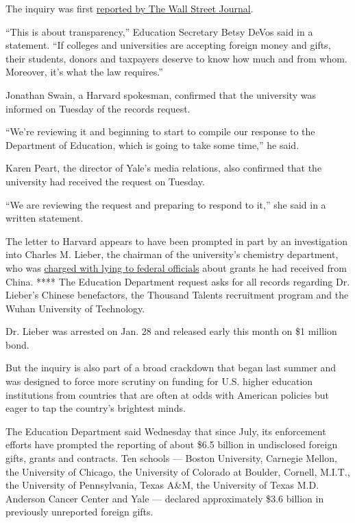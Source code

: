 The inquiry was first
\href{https://www.wsj.com/articles/education-department-investigating-harvard-yale-over-foreign-funding-11581539042}{reported
by The Wall Street Journal}.

``This is about transparency,'' Education Secretary Betsy DeVos said in
a statement. ``If colleges and universities are accepting foreign money
and gifts, their students, donors and taxpayers deserve to know how much
and from whom. Moreover, it's what the law requires.''

Jonathan Swain, a Harvard spokesman, confirmed that the university was
informed on Tuesday of the records request.

``We're reviewing it and beginning to start to compile our response to
the Department of Education, which is going to take some time,'' he
said.

Karen Peart, the director of Yale's media relations, also confirmed that
the university had received the request on Tuesday.

``We are reviewing the request and preparing to respond to it,'' she
said in a written statement.

The letter to Harvard appears to have been prompted in part by an
investigation into Charles M. Lieber, the chairman of the university's
chemistry department, who was
\href{https://www.nytimes.com/2020/01/28/us/charles-lieber-harvard.html}{charged
with lying to federal officials} about grants he had received from
China. **** The Education Department request asks for all records
regarding Dr. Lieber's Chinese benefactors, the Thousand Talents
recruitment program and the Wuhan University of Technology.

Dr. Lieber was arrested on Jan. 28 and released early this month on \$1
million bond.

But the inquiry is also part of a broad crackdown that began last summer
and was designed to force more scrutiny on funding for U.S. higher
education institutions from countries that are often at odds with
American policies but eager to tap the country's brightest minds.

The Education Department said Wednesday that since July, its enforcement
efforts have prompted the reporting of about \$6.5 billion in
undisclosed foreign gifts, grants and contracts. Ten schools --- Boston
University, Carnegie Mellon, the University of Chicago, the University
of Colorado at Boulder, Cornell, M.I.T., the University of Pennsylvania,
Texas A\&M, the University of Texas M.D. Anderson Cancer Center and Yale
--- declared approximately \$3.6 billion in previously unreported
foreign gifts.

